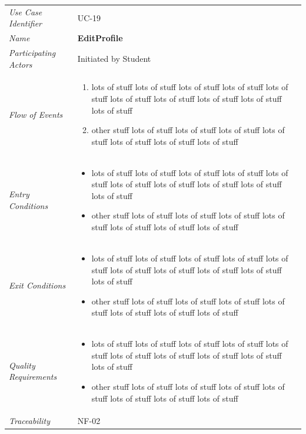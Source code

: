 \documentclass[12pt,letterpaper]{article}
\begin{document}
\begin{center}
	\begin{tabu} to 
		\toprule
		Use Case Identifier & UC-19 \\
		Name & {\bf EditProfile} \\
		Participating Actors & Initiated by Student \\
		Flow of Events & 
	    \begin{enumerate}[topsep=-1em]
		    \item lots of stuff lots of stuff lots of stuff lots of stuff lots of stuff lots of stuff lots of stuff lots of stuff lots of stuff lots of stuff
		    \item other stuff lots of stuff lots of stuff lots of stuff lots of stuff lots of stuff lots of stuff lots of stuff
		\end{enumerate} \\

		Entry Conditions &
		\begin{itemize}[topsep=-1em]
		    \item lots of stuff lots of stuff lots of stuff lots of stuff lots of stuff lots of stuff lots of stuff lots of stuff lots of stuff lots of stuff
		    \item other stuff lots of stuff lots of stuff lots of stuff lots of stuff lots of stuff lots of stuff lots of stuff
        \end{itemize} \\

		Exit Conditions &
		\begin{itemize}[topsep=-1em]
		    \item lots of stuff lots of stuff lots of stuff lots of stuff lots of stuff lots of stuff lots of stuff lots of stuff lots of stuff lots of stuff
		    \item other stuff lots of stuff lots of stuff lots of stuff lots of stuff lots of stuff lots of stuff lots of stuff
        \end{itemize} \\

		Quality Requirements &
		\begin{itemize}[topsep=-1em]
		    \item lots of stuff lots of stuff lots of stuff lots of stuff lots of stuff lots of stuff lots of stuff lots of stuff lots of stuff lots of stuff
		    \item other stuff lots of stuff lots of stuff lots of stuff lots of stuff lots of stuff lots of stuff lots of stuff
        \end{itemize} \\

		Traceability & NF-02 \\
		\toprule
	\end{tabu}
\end{center}
\end{document}
